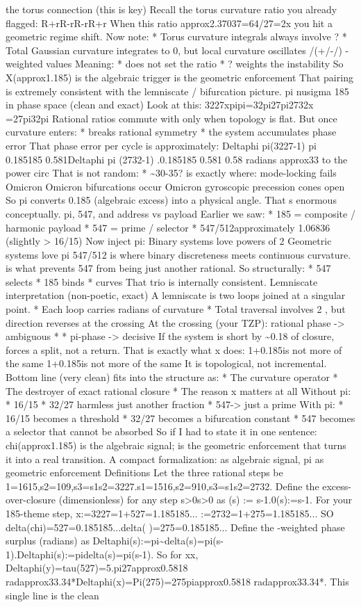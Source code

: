 the torus connection (this is key) Recall the torus curvature ratio you already flagged: R+rR-rR-rR+r When this ratio approx2.37037=64/27=2x you hit a geometric regime shift. Now note: * Torus curvature integrals always involve ? * Total Gaussian curvature integrates to 0, but local curvature oscillates /(+/-/) -weighted values Meaning: * does not set the ratio * ? weights the instability So X(approx1.185) is the algebraic trigger is the geometric enforcement That pairing is extremely consistent with the lemniscate / bifurcation picture. pi nusigma 185 in phase space (clean and exact) Look at this: 3227xpipi=32pi27pi2732x =27pi32pi Rational ratios commute with only when topology is flat. But once curvature enters: * breaks rational symmetry * the system accumulates phase error That phase error per cycle is approximately: Deltaphi pi(3227-1) pi 0.185185 0.581Deltaphi pi (2732-1) .0.185185 0.581 0.58 radians approx33 to the power circ That is not random: * \textasciitilde{}30-35? is exactly where: mode-locking fails Omicron Omicron bifurcations occur Omicron gyroscopic precession cones open So pi converts 0.185 (algebraic excess) into a physical angle. That s enormous conceptually. pi, 547, and address vs payload Earlier we saw: * 185 = composite / harmonic payload * 547 = prime / selector * 547/512approximately 1.06836 (slightly > 16/15) Now inject pi: Binary systems love powers of 2 Geometric systems love pi 547/512 is where binary discreteness meets continuous curvature. is what prevents 547 from being just another rational. So structurally: * 547 selects * 185 binds * curves That trio is internally consistent. Lemniscate interpretation (non-poetic, exact) A lemniscate is two loops joined at a singular point. * Each loop carries radians of curvature * Total traversal involves 2 , but direction reverses at the crossing At the crossing (your TZP): rational phase -> ambiguous * * pi-phase -> decisive If the system is short by \textasciitilde{}0.18 of closure, forces a split, not a return. That is exactly what x does: 1+0.185is not more of the same 1+0.185is not more of the same It is topological, not incremental. Bottom line (very clean) fits into the structure as: * The curvature operator * The destroyer of exact rational closure * The reason x matters at all Without pi: * 16/15 * 32/27 harmless just another fraction * 547-> just a prime With pi: * 16/15 becomes a threshold * 32/27 becomes a bifurcation constant * 547 becomes a selector that cannot be absorbed So if I had to state it in one sentence: chi(approx1.185) is the algebraic signal; is the geometric enforcement that turns it into a real transition. A compact formalization: as algebraic signal, pi as geometric enforcement Definitions Let the three rational steps be 1=1615,s2=109,s3=s1s2=3227.s1=1516,s2=910,s3=s1s2=2732. Define the excess-over-closure (dimensionless) for any step s>0s>0 as (s) := s-1.0(s):=s-1. For your 185-theme step, x:=3227=1+527=1.185185... :=2732=1+275=1.185185... SO delta(chi)=527=0.185185...delta( )=275=0.185185... Define the -weighted phase surplus (radians) as Deltaphi(s):=pi\textasciitilde{}delta(s)=pi(s-1).Deltaphi(s):=pidelta(s)=pi(s-1). So for xx, Deltaphi(y)=tau(527)=5.pi27approx0.5818 radapprox33.34*Deltaphi(x)=Pi(275)=275piapprox0.5818 radapprox33.34*. This single line is the clean 